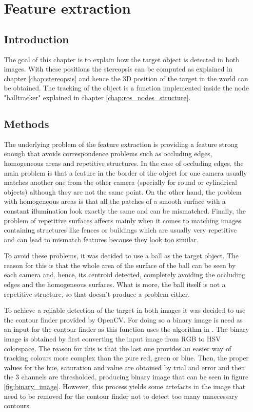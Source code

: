 \chapter{Feature extraction} %
\label{chap:feature_extraction}
\section{Introduction}
The goal of this chapter is to explain how the target object is detected in both images. With these positions the stereopsis can be computed as explained in chapter \ref{chap:stereopsis} and hence the 3D position of the target in the world can be obtained.
The tracking of the object is a function implemented inside the node "balltracker" explained in chapter \ref{chap:ros_nodes_structure}.

\section{Methods}
The underlying problem of the feature extraction is providing a feature strong enough that avoids correspondence problems such as occluding edges, homogeneous areas and repetitive structures.
In the case of occluding edges, the main problem is that a feature in the border of the object for one camera usually matches another one from the other camera (specially for round or cylindrical objects) although they are not the same point.
On the other hand, the problem with homogeneous areas is that all the patches of a smooth surface with a constant illumination look exactly the same and can be mismatched.
Finally, the problem of repetitive surfaces affects mainly when it comes to matching images containing structures like fences or buildings which are usually very repetitive and can lead to mismatch features because they look too similar.

To avoid these problems, it was decided to use a ball as the target object.
The reason for this is that the whole area of the surface of the ball can be seen by each camera and, hence, its centroid detected, completely avoiding the occluding edges and the homogeneous surfaces.
What is more, the ball itself is not a repetitive structure, so that doesn't produce a problem either.

To achieve a reliable detection of the target in both images it was decided to use the contour finder provided by OpenCV.
For doing so a binary image is need as an input for the contour finder as this function uses the algorithm in \cite{suzuki}. 
The binary image is obtained by first converting the input image from RGB to HSV colorspace.
The reason for this is that the last one provides an easier way of tracking colours more complex than the pure red, green or blue.
Then, the proper values for the hue, saturation and value are obtained by trial and error and then the 3 channels are thresholded, producing binary image that can be seen in figure \ref{fig:binary_image}.
However, this process yields some artefacts in the image that need to be removed for the contour finder not to detect too many unnecessary contours.
 
